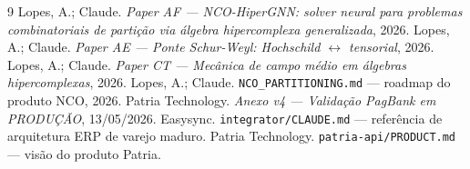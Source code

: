 \documentclass[11pt,a4paper]{article}
\begin{document}
\begin{thebibliography}{9}
 Lopes, A.; Claude.
\emph{Paper AF --- NCO-HiperGNN: solver neural para problemas combinatoriais
de partição via álgebra hipercomplexa generalizada}, 2026.
 Lopes, A.; Claude.
\emph{Paper AE --- Ponte Schur-Weyl: Hochschild $\leftrightarrow$ tensorial},
2026.
 Lopes, A.; Claude.
\emph{Paper CT --- Mecânica de campo médio em álgebras hipercomplexas},
2026.
 Lopes, A.; Claude.
\texttt{NCO\_PARTITIONING.md} --- roadmap do produto NCO, 2026.
 Patria Technology.
\emph{Anexo v4 --- Validação PagBank em PRODUÇÃO}, 13/05/2026.
 Easysync.
\texttt{integrator/CLAUDE.md} --- referência de arquitetura ERP de varejo
maduro.
 Patria Technology.
\texttt{patria-api/PRODUCT.md} --- visão do produto Patria.
\end{thebibliography}
\end{document}
